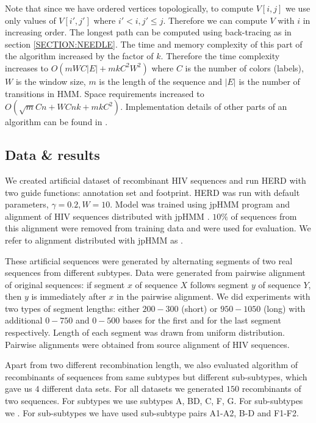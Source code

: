 Note that since we have ordered vertices topologically, to compute $V[i, j]$ we
use only values of $V[i', j']$ where $i'< i, j'\leq j$. Therefore we can compute
$V$ with $i$ in increasing order. The longest path can be computed using
back-tracing as in section \ref{SECTION:NEEDLE}. The time and memory complexity 
of this part of the algorithm increased by the factor of $k$. Therefore the time
complexity increases to $O(mWC|E|+mkC^2W^2)$ where $C$ is the number of colors
(labels), $W$ is the window size, $m$ is the length of the sequence and $|E|$ is
the number of transitions in HMM.  Space requirements increased to
$O(\sqrt{m}Cn+WCnk+mkC^2)$. Implementation details of other parts of an
algorithm can be found in \cite{Nanasi2010mgr}.

\subsection{Data \& results}
We created artificial dataset of recombinant HIV sequences and run HERD with two
guide functions: annotation set and footprint. HERD was run with default
parameters, $\gamma=0.2, W=10$. Model was trained using jpHMM program and
alignment of HIV sequences distributed with jpHMM \cite{Schultz2006}.  $10\%$ of
sequences from this alignment were removed from training data and were used for
evaluation. We refer to alignment distributed with jpHMM as .

These artificial sequences were generated by alternating segments of two real
sequences from different subtypes. Data were generated from pairwise alignment
of original sequences: if segment $x$ of sequence $X$ follows segment $y$ of
sequence $Y$, then $y$ is immediately after $x$ in the pairwise alignment. We
did experiments with two types of segment lengths: either $200-300$ (short) or
$950-1050$ (long) with additional $0-750$ and $0-500$ bases for the first and
for the last segment respectively. Length of each segment was drawn from uniform
distribution.  Pairwise alignments were obtained from source alignment of HIV
sequences.

Apart from two different recombination length, we also evaluated algorithm of
recombinants of sequences from same subtypes but different sub-subtypes, which
gave us $4$ different data sets. For all datasets we generated $150$
recombinants of two sequences. For subtypes we use subtypes A, BD, C, F, G. For
sub-subtypes we . For sub-subtypes we have used sub-subtype pairs A1-A2, B-D and
F1-F2.

